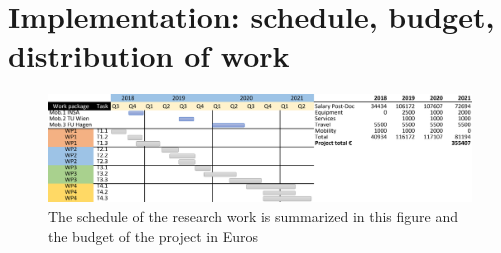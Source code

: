 \documentclass{article}
\begin{document}
\section{Implementation: schedule, budget, distribution of work}
\begin{figure}[h]
	\centering
	\includegraphics[scale=0.7]{fig/schedule.png}
	\caption{The schedule of the research work is summarized in this figure and the budget of the project in Euros}
	\label{fig:schedule}
\end{figure}
\end{document}
